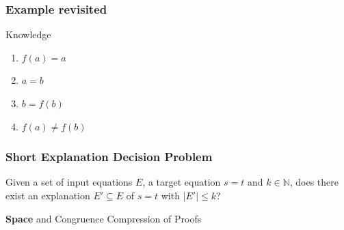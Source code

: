 \documentclass{beamer}
\begin{document}
\begin{frame}

\frametitle{Example revisited}

\begin{block}{Knowledge}
	\begin{enumerate}
		\item $f(a) = a$
		\item $a = b$
		\item $b = f(b)$
		\item $f(a) \neq f(b)$
	\end{enumerate}
\end{block}

\end{frame}

\begin{frame}

\frametitle{Short Explanation Decision Problem}

\centering Given a set of input equations $E$, a target equation $s = t$ and $k \in \mathbb{N}$, does there exist an explanation $E' \subseteq E$ of $s = t$ with $|E'| \leq k$?



\end{frame}

%
%

\begin{frame}

\centering \textbf{\huge{Space}} and Congruence Compression of Proofs

\end{frame}
\end{document}
